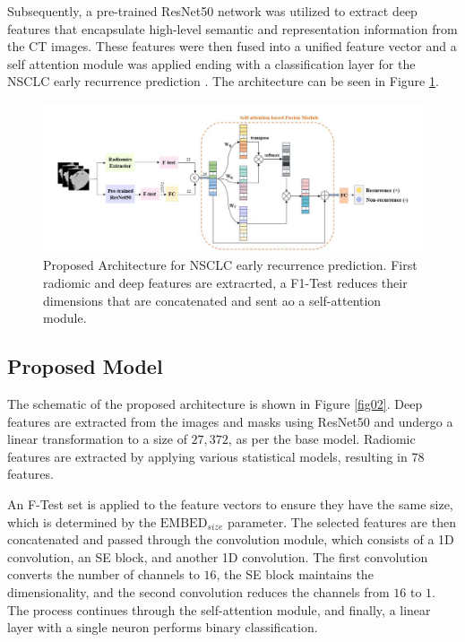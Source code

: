 \documentclass[journal,twoside,web]{ieeecolor}
\begin{document}
Subsequently, a pre-trained ResNet50 network was utilized to extract deep features that encapsulate high-level semantic and representation information from the \gls{CT} images. These features were then fused into a unified feature vector and a self attention module was applied ending with a classification layer for the \gls{NSCLC} early recurrence prediction \cite{aiSelfAttentionBasedFusion2023}. The architecture can be seen in Figure \ref{fig01}.


\begin{figure}[h]
\centerline{\includegraphics[width=\columnwidth]{figures/fig01.png}}
\caption{Proposed  Architecture for \gls{NSCLC} early recurrence prediction. First radiomic and deep features are extracrted, a F1-Test reduces their dimensions that are concatenated and sent ao a self-attention module.}
\label{fig01}
\end{figure}

\subsection{Proposed Model}

The schematic of the proposed architecture is shown in Figure \ref{fig02}. Deep features are extracted from the images and masks using ResNet50 and undergo a linear transformation to a size of $27,372$, as per the base model. Radiomic features are extracted by applying various statistical models, resulting in 78 features.

An F-Test set is applied to the feature vectors to ensure they have the same size, which is determined by the $\text{EMBED}_{size}$ parameter. The selected features are then concatenated and passed through the convolution module, which consists of a 1D convolution, an \gls{SE} block, and another 1D convolution. The first convolution converts the number of channels to $16$, the SE block maintains the dimensionality, and the second convolution reduces the channels from $16$ to $1$. The process continues through the self-attention module, and finally, a linear layer with a single neuron performs binary classification.
\end{document}
